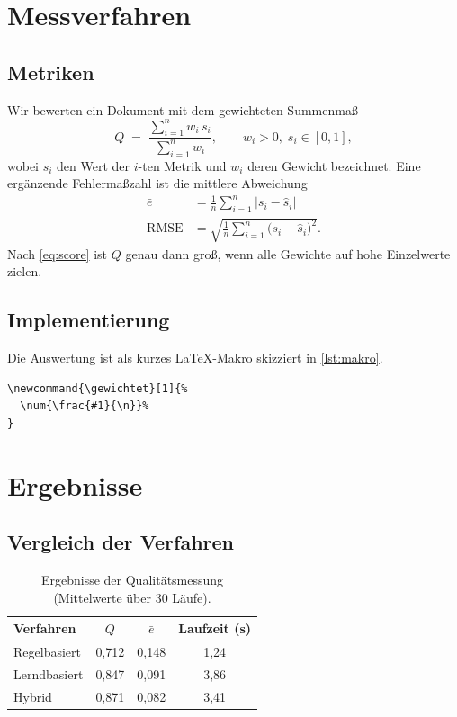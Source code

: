 \documentclass[11pt,a4paper]{article}
\begin{document}
\section{Messverfahren}
\label{sec:methode}

\subsection{Metriken}

Wir bewerten ein Dokument mit dem gewichteten Summenmaß
\begin{equation}
  \label{eq:score}
  Q \;=\; \frac{\sum_{i=1}^{n} w_i \, s_i}{\sum_{i=1}^{n} w_i},
  \qquad w_i > 0,\; s_i \in [0,1],
\end{equation}
wobei $s_i$ den Wert der $i$-ten Metrik und $w_i$ deren Gewicht bezeichnet.
Eine ergänzende Fehlermaßzahl ist die mittlere Abweichung
\begin{align}
  \bar{e} &= \frac{1}{n}\sum_{i=1}^{n}\bigl|s_i - \hat{s}_i\bigr|
  \label{eq:mae}\\
  \operatorname{RMSE} &= \sqrt{\frac{1}{n}\sum_{i=1}^{n}\bigl(s_i - \hat{s}_i\bigr)^2}.
  \label{eq:rmse}
\end{align}
Nach \cref{eq:score} ist $Q$ genau dann groß, wenn alle Gewichte auf
hohe Einzelwerte zielen.

\subsection{Implementierung}

Die Auswertung ist als kurzes \LaTeX-Makro skizziert in
\cref{lst:makro}.

\begin{lstlisting}[caption={Gewichtete Mittelwertbildung}, label={lst:makro}]
\newcommand{\gewichtet}[1]{%
  \num{\frac{#1}{\n}}%
}
\end{lstlisting}

\section{Ergebnisse}
\label{sec:ergebnisse}

\subsection{Vergleich der Verfahren}

\begin{table}[htbp]
  \centering
  \caption{Ergebnisse der Qualitätsmessung (Mittelwerte über 30 Läufe).}
  \label{tab:ergebnisse}
  \begin{tabular}{l S[table-format=1.3] S[table-format=1.3] S[table-format=1.2]}
    \toprule
    Verfahren & {$Q$} & {$\bar{e}$} & {Laufzeit (\si{\second})} \\
    \midrule
    Regelbasiert   & 0,712 & 0,148 & 1,24 \\
    Lerndbasiert   & 0,847 & 0,091 & 3,86 \\
    Hybrid         & 0,871 & 0,082 & 3,41 \\
    \bottomrule
  \end{tabular}
\end{table}
\end{document}
